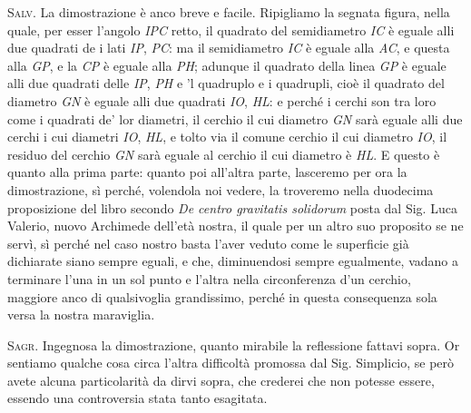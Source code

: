 \documentclass[11pt,twoside,openany]{book}
\newcommand{\speaker}[1]{\textcolor{rubric}{\textsc{#1}}\space}
\begin{document}
\speaker{Salv.} La dimostrazione è anco breve e facile. Ripigliamo la segnata figura, nella quale, per esser l'angolo \emph{IPC} retto, il quadrato del semidiametro \emph{IC} è eguale alli due quadrati de i lati \emph{IP}, \emph{PC}: ma il semidiametro \emph{IC} è eguale alla \emph{AC}, e questa alla \emph{GP}, e la \emph{CP} è eguale alla \emph{PH}; adunque il quadrato della linea \emph{GP} è eguale alli due quadrati delle \emph{IP}, \emph{PH} e 'l quadruplo e i quadrupli, cioè il quadrato del diametro \emph{GN} è eguale alli due quadrati \emph{IO}, \emph{HL}: e perché i cerchi son tra loro come i quadrati de' lor diametri, il cerchio il cui diametro \emph{GN} sarà eguale alli due cerchi i cui diametri \emph{IO}, \emph{HL}, e tolto via il comune cerchio il cui diametro \emph{IO}, il residuo del cerchio \emph{GN} sarà eguale al cerchio il cui diametro è \emph{HL}. E questo è quanto alla prima parte: quanto poi all'altra parte, lasceremo per ora la dimostrazione, sì perché, volendola noi vedere, la troveremo nella duodecima proposizione del libro secondo \emph{De centro gravitatis solidorum} posta dal Sig. Luca Valerio, nuovo Archimede dell'età nostra, il quale per un altro suo proposito se ne servì, sì perché nel caso nostro basta l'aver veduto come le superficie già dichiarate siano sempre eguali, e che, diminuendosi sempre egualmente, vadano a terminare l'una in un sol punto e l'altra nella circonferenza d'un cerchio, maggiore anco di qualsivoglia grandissimo, perché in questa consequenza sola versa la nostra maraviglia.

\speaker{Sagr.} Ingegnosa la dimostrazione, quanto mirabile la reflessione fattavi sopra. Or sentiamo qualche cosa circa l'altra difficoltà promossa dal Sig. Simplicio, se però avete alcuna particolarità da dirvi sopra, che crederei che non potesse essere, essendo una controversia stata tanto esagitata.
\end{document}
